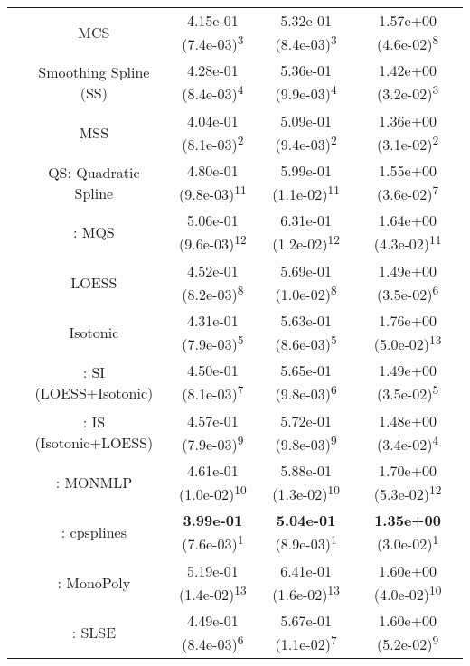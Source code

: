 \begin{tabular}{ccccc}
&MCS& 4.15e-01 (7.4e-03)\textsuperscript{3}& 5.32e-01 (8.4e-03)\textsuperscript{3}& 1.57e+00 (4.6e-02)\textsuperscript{8}\tabularnewline
&Smoothing Spline (SS)& 4.28e-01 (8.4e-03)\textsuperscript{4}& 5.36e-01 (9.9e-03)\textsuperscript{4}& 1.42e+00 (3.2e-02)\textsuperscript{3}\tabularnewline
&MSS& 4.04e-01 (8.1e-03)\textsuperscript{2}& 5.09e-01 (9.4e-03)\textsuperscript{2}& 1.36e+00 (3.1e-02)\textsuperscript{2}\tabularnewline
&QS: Quadratic Spline& 4.80e-01 (9.8e-03)\textsuperscript{11}& 5.99e-01 (1.1e-02)\textsuperscript{11}& 1.55e+00 (3.6e-02)\textsuperscript{7}\tabularnewline
&\textcite{heMonotoneBsplineSmoothing1998}: MQS& 5.06e-01 (9.6e-03)\textsuperscript{12}& 6.31e-01 (1.2e-02)\textsuperscript{12}& 1.64e+00 (4.3e-02)\textsuperscript{11}\tabularnewline
&LOESS& 4.52e-01 (8.2e-03)\textsuperscript{8}& 5.69e-01 (1.0e-02)\textsuperscript{8}& 1.49e+00 (3.5e-02)\textsuperscript{6}\tabularnewline
&Isotonic& 4.31e-01 (7.9e-03)\textsuperscript{5}& 5.63e-01 (8.6e-03)\textsuperscript{5}& 1.76e+00 (5.0e-02)\textsuperscript{13}\tabularnewline
&\textcite{mammenEstimatingSmoothMonotone1991}: SI (LOESS+Isotonic)& 4.50e-01 (8.1e-03)\textsuperscript{7}& 5.65e-01 (9.8e-03)\textsuperscript{6}& 1.49e+00 (3.5e-02)\textsuperscript{5}\tabularnewline
&\textcite{mammenEstimatingSmoothMonotone1991}: IS (Isotonic+LOESS)& 4.57e-01 (7.9e-03)\textsuperscript{9}& 5.72e-01 (9.8e-03)\textsuperscript{9}& 1.48e+00 (3.4e-02)\textsuperscript{4}\tabularnewline
&\textcite{cannonMonmlpMultilayerPerceptron2017}: MONMLP& 4.61e-01 (1.0e-02)\textsuperscript{10}& 5.88e-01 (1.3e-02)\textsuperscript{10}& 1.70e+00 (5.3e-02)\textsuperscript{12}\tabularnewline
&\textcite{navarro-garciaConstrainedSmoothingOutofrange2023}: cpsplines& \textbf{3.99e-01} (7.6e-03)\textsuperscript{1}& \textbf{5.04e-01} (8.9e-03)\textsuperscript{1}& \textbf{1.35e+00} (3.0e-02)\textsuperscript{1}\tabularnewline
&\textcite{murrayFastFlexibleMethods2016a}: MonoPoly& 5.19e-01 (1.4e-02)\textsuperscript{13}& 6.41e-01 (1.6e-02)\textsuperscript{13}& 1.60e+00 (4.0e-02)\textsuperscript{10}\tabularnewline
&\textcite{groeneboomConfidenceIntervalsMonotone2023}: SLSE& 4.49e-01 (8.4e-03)\textsuperscript{6}& 5.67e-01 (1.1e-02)\textsuperscript{7}& 1.60e+00 (5.2e-02)\textsuperscript{9}\tabularnewline
\bottomrule
\end{tabular}
